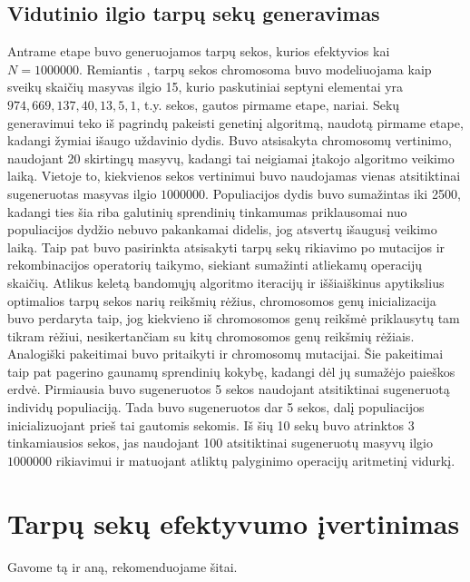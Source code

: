 \documentclass{VUMIFInfKursinis}
\begin{document}
\subsection{Vidutinio ilgio tarpų sekų generavimas}
Antrame etape buvo generuojamos tarpų sekos, kurios efektyvios kai $N=1000000$.
Remiantis \cite{simpson1999faster}, tarpų sekos chromosoma buvo modeliuojama kaip
sveikų skaičių masyvas ilgio 15, kurio paskutiniai septyni elementai yra $974, 669, 137, 40, 13, 5, 1$, t.y. sekos, gautos pirmame etape, nariai.
Sekų generavimui teko iš pagrindų pakeisti genetinį algoritmą, naudotą pirmame etape, kadangi žymiai išaugo uždavinio dydis.
Buvo atsisakyta chromosomų vertinimo, naudojant 20 skirtingų masyvų, kadangi tai neigiamai įtakojo algoritmo veikimo laiką.
Vietoje to, kiekvienos sekos vertinimui buvo naudojamas vienas atsitiktinai sugeneruotas masyvas ilgio $1000000$.
Populiacijos dydis buvo sumažintas iki 2500, kadangi ties šia riba galutinių sprendinių tinkamumas priklausomai nuo populiacijos dydžio nebuvo pakankamai didelis,
jog atsvertų išaugusį veikimo laiką.
Taip pat buvo pasirinkta atsisakyti tarpų sekų rikiavimo po mutacijos ir rekombinacijos operatorių taikymo, siekiant sumažinti atliekamų operacijų skaičių.
Atlikus keletą bandomųjų algoritmo iteracijų ir iššiaiškinus apytikslius optimalios tarpų sekos narių reikšmių rėžius, chromosomos genų inicializacija buvo perdaryta taip,
jog kiekvieno iš chromosomos genų reikšmė priklausytų tam tikram rėžiui, nesikertančiam su kitų chromosomos genų reikšmių rėžiais. Analogiški pakeitimai buvo pritaikyti ir chromosomų mutacijai.
Šie pakeitimai taip pat pagerino gaunamų sprendinių kokybę, kadangi dėl jų sumažėjo paieškos erdvė.
Pirmiausia buvo sugeneruotos 5 sekos naudojant atsitiktinai sugeneruotą individų populiaciją.
Tada buvo sugeneruotos dar 5 sekos, dalį populiacijos inicializuojant prieš tai gautomis sekomis.
Iš šių 10 sekų buvo atrinktos 3 tinkamiausios sekos, jas naudojant 100 atsitiktinai sugeneruotų masyvų ilgio $1000000$ rikiavimui
ir matuojant atliktų palyginimo operacijų aritmetinį vidurkį.


\section{Tarpų sekų efektyvumo įvertinimas}

Gavome tą ir aną, rekomenduojame šitai.
\end{document}
